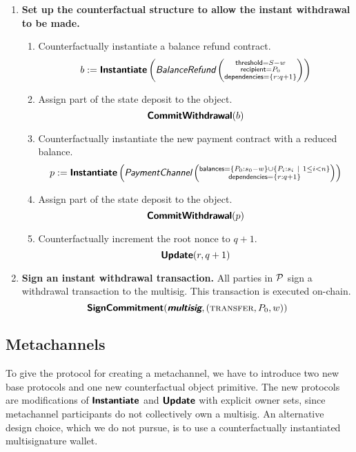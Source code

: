 \documentclass[prb,floatfix,reprint,nofootinbib,amsmath,amssymb,epsfig,pre,floats,letterpaper,groupedaffiliation,tightenlines,allcolors=blue,11pt]{revtex4}
\theoremstyle{definition}
\theoremstyle{definition}
\theoremstyle{definition}
\begin{document}
\begin{enumerate}

\item \textbf{Set up the counterfactual structure to allow the instant withdrawal to be made.}

\begin{enumerate}

\item Counterfactually instantiate a balance refund contract.
\[
    b := \Instantiate\left(\balancerefund\left(\substack{
    \textsf{threshold}=S - w \\
    \textsf{recipient}=P_0 \\
    \textsf{dependencies}=\left\{r:q+1\right\}
    }\right)
    \right)
\]

\item Assign part of the state deposit to the object.
\[
    \CommitWithdrawal(b)
\]

\item Counterfactually instantiate the new payment contract with a reduced balance.
\[
    p := \Instantiate\left(\paymentchannel\left(\substack{
    \textsf{balances}=\{P_0 : s_0 - w\} \cup \{P_i:s_i \| 1 \le i < n \} \\
    \textsf{dependencies}=\left\{r:q+1\right\}
    }\right)
    \right)
\]

\item Assign part of the state deposit to the object.
\[
    \CommitWithdrawal(p)
\]

\item Counterfactually increment the root nonce to $q + 1$.
\[
\Update(r, q+1)
\]

\end{enumerate}

\item \textbf{Sign an instant withdrawal transaction.}
All parties in $\P$ sign a withdrawal transaction to the multisig. This transaction is executed on-chain.
\[
    \SignCommitment(\multisig, (\textsc{transfer}, P_0, w))
\]

\end{enumerate}

\subsection{Metachannels}

To give the protocol for creating a metachannel, we have to introduce two new base protocols and one new counterfactual object primitive. The new protocols are modifications of $\Instantiate$ and $\Update$ with explicit owner sets, since metachannel participants do not collectively own a multisig. An alternative design choice, which we do not pursue, is to use a counterfactually instantiated multisignature wallet.
\end{document}
